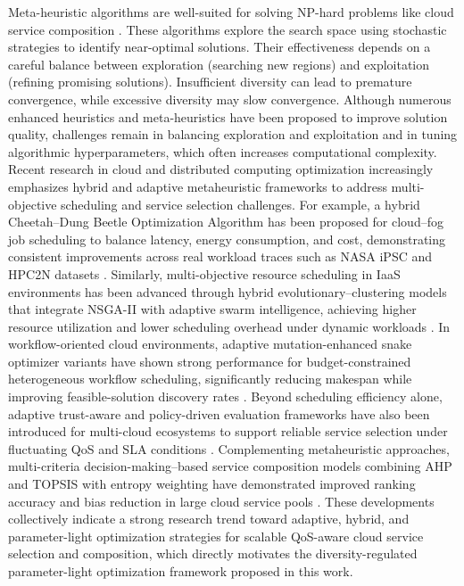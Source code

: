 \documentclass[3p,twocolumn]{elsarticle}
\theoremstyle{thmstyleone}%
\theoremstyle{thmstyletwo}%
\theoremstyle{thmstylethree}%
\begin{document}
Meta-heuristic algorithms are well-suited for solving NP-hard problems like cloud service composition \cite{anwit2020tour, anwit2020scheme}. These algorithms explore the search space using stochastic strategies to identify near-optimal solutions. Their effectiveness depends on a careful balance between exploration (searching new regions) and exploitation (refining promising solutions). Insufficient diversity can lead to premature convergence, while excessive diversity may slow convergence. Although numerous enhanced heuristics and meta-heuristics have been proposed to improve solution quality, challenges remain in balancing exploration and exploitation and in tuning algorithmic hyperparameters, which often increases computational complexity. Recent research in cloud and distributed computing optimization increasingly emphasizes hybrid and adaptive metaheuristic frameworks to address multi-objective scheduling and service selection challenges.  For example, a hybrid Cheetah–Dung Beetle Optimization Algorithm has been proposed for cloud–fog job scheduling to balance latency, energy consumption, and cost, demonstrating consistent improvements across real workload traces such as NASA iPSC and HPC2N datasets \cite{gurrala2026novel}. Similarly, multi-objective resource scheduling in IaaS environments has been advanced through hybrid evolutionary–clustering models that integrate NSGA-II with adaptive swarm intelligence, achieving higher resource utilization and lower scheduling overhead under dynamic workloads \cite{radhamani2025multi}. In workflow-oriented cloud environments, adaptive mutation-enhanced snake optimizer variants have shown strong performance for budget-constrained heterogeneous workflow scheduling, significantly reducing makespan while improving feasible-solution discovery rates \cite{zhang2025adaptive}. Beyond scheduling efficiency alone, adaptive trust-aware and policy-driven evaluation frameworks have also been introduced for multi-cloud ecosystems to support reliable service selection under fluctuating QoS and SLA conditions \cite{gupta2025adaptive}. Complementing metaheuristic approaches, multi-criteria decision-making–based service composition models combining AHP and TOPSIS with entropy weighting have demonstrated improved ranking accuracy and bias reduction in large cloud service pools \cite{swathi2025adaptive}. These developments collectively indicate a strong research trend toward adaptive, hybrid, and parameter-light optimization strategies for scalable QoS-aware cloud service selection and composition, which directly motivates the diversity-regulated parameter-light optimization framework proposed in this work.
\end{document}

